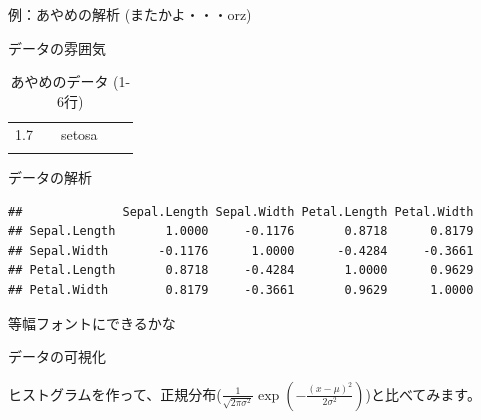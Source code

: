 \begin{frame}[fragile]{例：あやめの解析 (またかよ・・・orz)}
\begin{block}{データの雰囲気}
\begin{longtable}[c]{@{}ccccc@{}}
\begin{minipage}[t]{0.18\columnwidth}
1.7
\end{minipage} & \begin{minipage}[t]{0.17\columnwidth}\centering
0.4
\end{minipage} & \begin{minipage}[t]{0.11\columnwidth}\centering
setosa
\end{minipage}
\\\addlinespace
\bottomrule
\addlinespace
\caption{あやめのデータ (1-6行)}
\end{longtable}

\end{block}

\begin{block}{データの解析}

\begin{Shaded}
\begin{Highlighting}[]
\NormalTok{(iris[, -}\NormalTok{])}
\end{Highlighting}
\end{Shaded}

\begin{verbatim}
##              Sepal.Length Sepal.Width Petal.Length Petal.Width
## Sepal.Length       1.0000     -0.1176       0.8718      0.8179
## Sepal.Width       -0.1176      1.0000      -0.4284     -0.3661
## Petal.Length       0.8718     -0.4284       1.0000      0.9629
## Petal.Width        0.8179     -0.3661       0.9629      1.0000
\end{verbatim}

等幅フォントにできるかな

\end{block}

\begin{block}{データの可視化}

ヒストグラムを作って、正規分布($\frac{1}{\sqrt{2\pi\sigma^2}} \exp\left(-\frac{\left(x-\mu\right)^2}{2\sigma^2}\right)$)と比べてみます。

\begin{Shaded}
\begin{Highlighting}[]
\NormalTok{(}\NormalTok{(}\NormalTok{, }\NormalTok{, }\NormalTok{, }\NormalTok{))}
\NormalTok{(}\NormalTok{(iris[, }\NormalTok{]), } \NormalTok{, }\NormalTok{(}\NormalTok{, }\NormalTok{))}
\NormalTok{(}\NormalTok{)}
\end{Highlighting}
\end{Shaded}


\end{block}
\end{frame}
